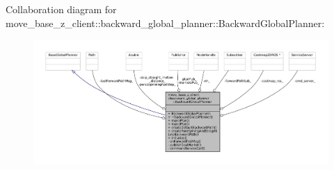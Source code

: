 Collaboration diagram for move\+\_\+base\+\_\+z\+\_\+client\+:\+:backward\+\_\+global\+\_\+planner\+:\+:Backward\+Global\+Planner\+:
\nopagebreak
\begin{figure}[H]
\begin{center}
\leavevmode
\includegraphics[width=350pt]{classmove__base__z__client_1_1backward__global__planner_1_1BackwardGlobalPlanner__coll__graph}
\end{center}
\end{figure}
